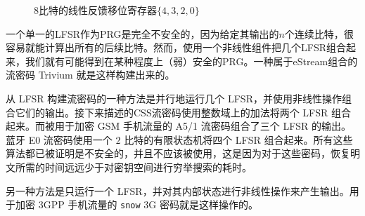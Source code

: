 \begin{figure}
	\centering
	
	\caption{$8$比特的线性反馈移位寄存器$\{4,3,2,0\}$}
	\label{fig:3-10}
\end{figure}

\begin{snote}[来自LSFR的流密码。]
一个单一的LFSR作为PRG是完全不安全的，因为给定其输出的$n$个连续比特，很容易就能计算出所有的后续比特。然而，使用一个非线性组件把几个LFSR组合起来，我们就有可能得到在某种程度上（弱）安全的PRG。一种属于eStream组合的流密码 Trivium 就是这样构建出来的。

从 LFSR 构建流密码的一种方法是并行地运行几个 LFSR，并使用非线性操作组合它们的输出。接下来描述的CSS流密码使用整数域上的加法将两个 LFSR 组合起来。而被用于加密 GSM 手机流量的 A5/1 流密码组合了三个 LFSR 的输出。蓝牙 E0 流密码使用一个 $2$ 比特的有限状态机将四个 LFSR 组合起来。所有这些算法都已被证明是不安全的，并且不应该被使用，这是因为对于这些密码，恢复明文所需的时间远远少于对密钥空间进行穷举搜索的耗时。

另一种方法是只运行一个 LFSR，并对其内部状态进行非线性操作来产生输出。用于加密 3GPP 手机流量的 \texttt{snow} 3G 密码就是这样操作的。
\end{snote}

